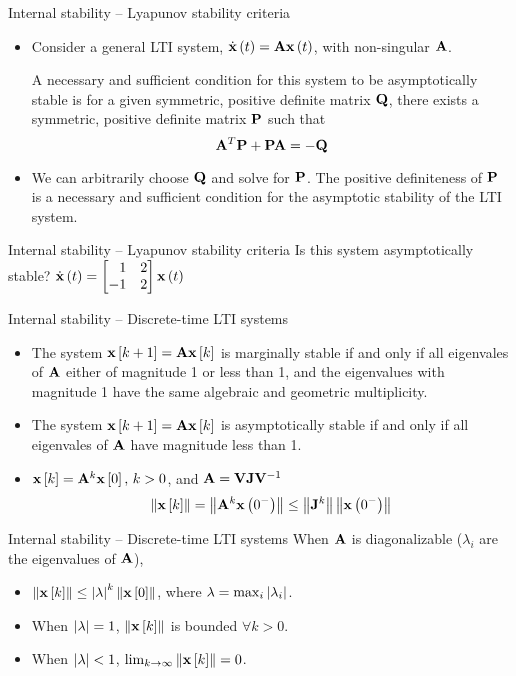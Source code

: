 \documentclass[aspectratio=169]{beamer}
\def\mf{\ensuremath\mathbf}
\def\lp{\ensuremath\left(}
\def\rp{\ensuremath\right)}
\def\lv{\ensuremath\left\lvert}
\def\rv{\ensuremath\right\rvert}
\def\lV{\ensuremath\left\lVert}
\def\rV{\ensuremath\right\rVert}
\def\ls{\ensuremath\left[}
\def\rs{\ensuremath\right]}
\def\bmx{\ensuremath\begin{bmatrix*}[r]}
\def\emx{\ensuremath\end{bmatrix*}}
\newcommand{\ct}[1]{\lp #1\rp}
\newcommand{\dt}[1]{\ls #1\rs}
\begin{document}
\begin{frame}{Internal stability -- Lyapunov stability criteria}
\begin{itemize}
    \item Consider a general LTI system, $\dot{\mf{x}}\ct{t} = \mf{A}\mf{x}\ct{t}$, with non-singular $\mf{A}$.

    A necessary and sufficient condition for this system to be asymptotically stable is for a given symmetric, positive definite matrix $\mf{Q}$, there exists a symmetric, positive definite matrix $\mf{P}$ such that
    \[ \mf{A}^T\mf{P} + \mf{P}\mf{A} = - \mf{Q} \] 

    \item We can arbitrarily choose $\mf{Q}$ and solve for $\mf{P}$. The positive definiteness of $\mf{P}$ is a necessary and sufficient condition for the asymptotic stability of the LTI system.
\end{itemize}
\end{frame}


\begin{frame}[t]{Internal stability -- Lyapunov stability criteria}
Is this system asymptotically stable? $\dot{\mf{x}}\ct{t} = \bmx 1 & 2 \\ -1 & 2 \emx\mf{x}\ct{t}$
\end{frame}


\begin{frame}[t]{Internal stability -- Discrete-time LTI systems}
\begin{itemize}
    \item The system $\mf{x}\dt{k+1} = \mf{A}\mf{x}\dt{k}$ is marginally stable if and only if all eigenvales of $\mf{A}$ either of magnitude 1 or less than 1, and the eigenvalues with magnitude 1 have the same algebraic and geometric multiplicity.

    \item  The system $\mf{x}\dt{k+1} = \mf{A}\mf{x}\dt{k}$ is asymptotically stable if and only if all eigenvales of $\mf{A}$ have magnitude less than 1.

    \item $\mf{x}\dt{k} = \mf{A}^k\mf{x}\dt{0}, \, k > 0$, and $\mf{A} = \mf{V}\mf{J}\mf{V}^{-1}$
    \[ \lV \mf{x}\dt{k} \rV = \lV \mf{A}^k\mf{x}\ct{0^-} \rV \leq \lV \mf{J}^k \rV \lV \mf{x}\ct{0^-} \rV\]
\end{itemize}
\end{frame}


\begin{frame}[t]{Internal stability -- Discrete-time LTI systems}
When $\mf{A}$ is diagonalizable ($\lambda_i$ are the eigenvalues of $\mf{A}$),
\begin{itemize}
    \item $\lV \mf{x}\dt{k} \rV \leq  \lv \lambda \rv^k \lV \mf{x}\dt{0} \rV$, where $\lambda = \max_i \lv \lambda_i \rv$.
    \item When $\lv \lambda \rv = 1$, $\lV \mf{x}\dt{k}\rV$ is bounded $\forall k > 0$.
    \item When $\lv \lambda \rv < 1$, $\lim_{k \to \infty} \lV \mf{x}\dt{k}\rV = 0$.
\end{itemize}
\end{frame}
\end{document}
